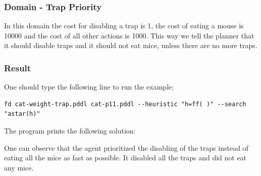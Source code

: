 \subsubsection{Domain - Trap Priority}

In this domain the cost for disabling a trap is 1, the cost of eating a mouse is 10000 and the cost of all other actions is 1000. This way we tell the planner that it should disable traps and it should not eat mice, unless there are no more traps.


\subsubsection{Result}

One should type the following line to run the example: 

\begin{lstlisting}[numbers=none]
fd cat-weight-trap.pddl cat-p11.pddl --heuristic "h=ff( )" --search "astar(h)"
\end{lstlisting}

The program prints the following solution:



One can observe that the agent prioritized the disabling of the traps instead of eating all the mice as fast as possible. It disabled all the traps and did not eat any mice.
